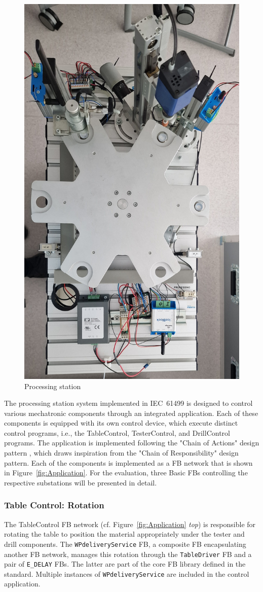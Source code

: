 \begin{bibunit}
\begin{figure}[!htbp]
	\centering
		\includegraphics[width=0.5\linewidth,clip]{MX_Papers/Paper10/Figures/processingStation.jpg}
		\caption{Processing station}
		\label{fig:ps}	
 \end{figure}

The processing station system implemented in IEC~61499 is designed to control various mechatronic components through an integrated application. Each of these components is equipped with its own control device, which execute distinct control programs, i.e., the TableControl, TesterControl, and DrillControl programs. The application is implemented following the "Chain of Actions" design pattern \cite{Patil.2018}, which draws inspiration from the "Chain of Responsibility" design pattern. Each of the components is implemented as a FB network that is shown in Figure~\ref{fig:Application}. For the evaluation, three Basic FBs controlling the respective substations will be presented in detail.

\subsubsection{Table Control: Rotation}
The TableControl FB network (cf. Figure~\ref{fig:Application} \textit{top}) is responsible for rotating the table to position the material appropriately under the tester and drill components. The \texttt{WPdeliveryService} FB, a composite FB encapsulating another FB network, manages this rotation through the \texttt{TableDriver} FB and a pair of \texttt{E\_DELAY} FBs. The latter are part of the core FB library defined in the standard. Multiple instances of \texttt{WPdeliveryService} are included in the control application. 


\end{bibunit}
